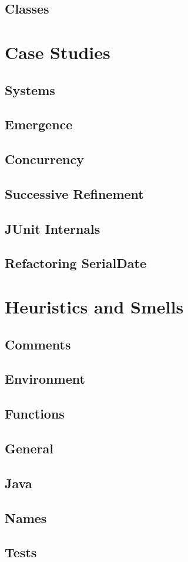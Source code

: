 \documentclass[a4paper, twocolumn]{article}
\begin{document}
\subsection{Classes}


\section{Case Studies}

\subsection{Systems}

\subsection{Emergence}

\subsection{Concurrency}

\subsection{Successive Refinement}

\subsection{JUnit Internals}

\subsection{Refactoring SerialDate}


\section{Heuristics and Smells}

\subsection{Comments}

\subsection{Environment}

\subsection{Functions}

\subsection{General}

\subsection{Java}

\subsection{Names}

\subsection{Tests}
\end{document}
